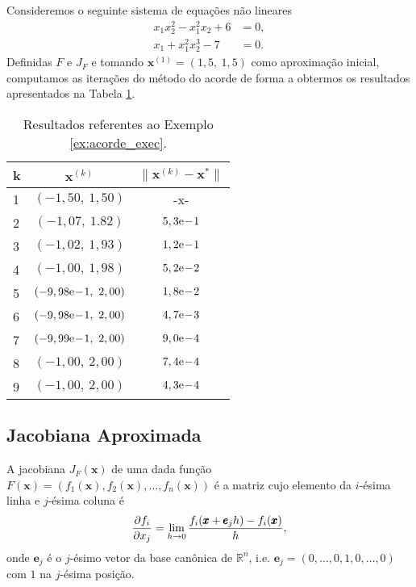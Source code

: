 \begin{ex}\label{ex:acorde_exec}
  Consideremos o seguinte sistema de equações não lineares
  \begin{align}
    x_1x_2^2 - x_1^2x_2 + 6 &= 0,\\
    x_1 + x_1^2x_2^3 - 7 &= 0.
  \end{align}
  Definidas $F$ e $J_F$ e tomando $\pmb{x}^{(1)} = (1,5,~1,5)$ como aproximação inicial, computamos as iterações do método do acorde de forma a obtermos os resultados apresentados na Tabela \ref{tab:ex_acorde_exec}.

  \begin{table}[h!]
    \centering
    \begin{tabular}{lcc}
      k & $\pmb{x}^{(k)}$ & $\|\pmb{x}^{(k)} - \pmb{x}^*\|$\\\hline
      1 & $(-1,50,~1,50)$ & -x- \\
      2 & $(-1,07,~1.82)$ & $5,3\mathrm{e}\!-\!1$ \\
      3 & $(-1,02,~1,93)$ & $1,2\mathrm{e}\!-\!1$ \\
      4 & $(-1,00,~1,98)$ & $5,2\mathrm{e}\!-\!2$ \\
      5 & $(-9,98\mathrm{e}\!-\!1,~2,00)$ & $1,8\mathrm{e}\!-\!2$ \\
      6 & $(-9,98\mathrm{e}\!-\!1,~2,00)$ & $4,7\mathrm{e}\!-\!3$ \\
      7 & $(-9,99\mathrm{e}\!-\!1,~2,00)$ & $9,0\mathrm{e}\!-\!4$ \\
      8 & $(-1,00,~2,00)$ & $7,4\mathrm{e}\!-\!4$ \\
      9 & $(-1,00,~2,00)$ & $4,3\mathrm{e}\!-\!4$ \\\hline
    \end{tabular}
    \caption{Resultados referentes ao Exemplo \ref{ex:acorde_exec}.}
    \label{tab:ex_acorde_exec}
  \end{table}

% 
\end{ex}

\subsection{Jacobiana Aproximada}
\badgeRevisar

A jacobiana $J_F(\pmb{x})$ de uma dada função $F(\pmb{x}) = (f_1(\pmb{x}), f_2(\pmb{x}), \dotsc, f_n(\pmb{x}))$ é a matriz cujo elemento da $i$-ésima linha e $j$-ésima coluna é
\begin{equation}
  \frac{\partial f_i}{\partial x_j} = \lim_{h\to 0} \frac{f_i(\pmb{x}+\pmb{e}_jh) - f_i(\pmb{x})}{h},
\end{equation}
onde $\pmb{e}_j$ é o $j$-ésimo vetor da base canônica de $\mathbb{R}^n$, i.e. $\pmb{e}_j = (0, \dotsc, 0, 1, 0, \dotsc, 0)$ com $1$ na $j$-ésima posição.

